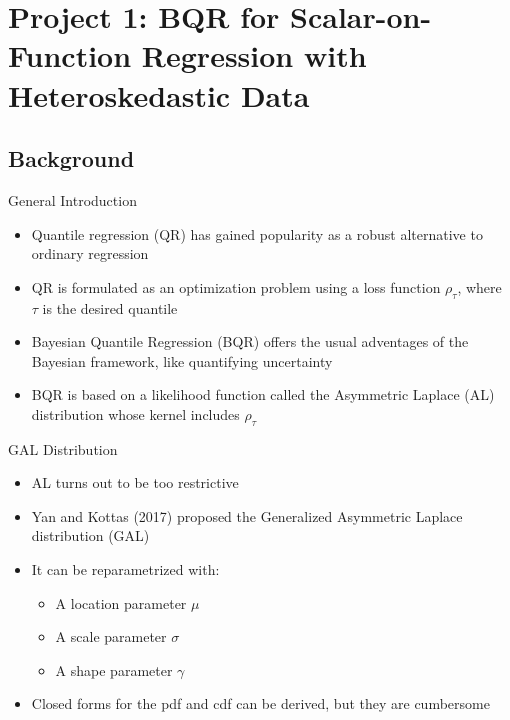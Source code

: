 \hypertarget{project-1-bqr-for-scalar-on-function-regression-with-heteroskedastic-data}{%
\section{Project 1: BQR for Scalar-on-Function Regression with
Heteroskedastic
Data}\label{project-1-bqr-for-scalar-on-function-regression-with-heteroskedastic-data}}

\hypertarget{background}{%
\subsection{Background}\label{background}}

\begin{frame}{General Introduction}
\protect\hypertarget{general-introduction}{}
\begin{itemize}
\tightlist
\item
  Quantile regression (QR) has gained popularity as a robust alternative
  to ordinary regression
\item
  QR is formulated as an optimization problem using a loss function
  \(\rho_\tau\), where \(\tau\) is the desired quantile
\item
  Bayesian Quantile Regression (BQR) offers the usual adventages of the
  Bayesian framework, like quantifying uncertainty
\item
  BQR is based on a likelihood function called the Asymmetric Laplace
  (AL) distribution whose kernel includes \(\rho_\tau\)
\end{itemize}
\end{frame}

\begin{frame}{GAL Distribution}
\protect\hypertarget{gal-distribution}{}
\begin{itemize}
\tightlist
\item
  AL turns out to be too restrictive
\item
  Yan and Kottas (2017) proposed the Generalized Asymmetric Laplace
  distribution (GAL)
\item
  It can be reparametrized with:

  \begin{itemize}
  \tightlist
  \item
    A location parameter \(\mu\)
  \item
    A scale parameter \(\sigma\)
  \item
    A shape parameter \(\gamma\)
  \end{itemize}
\item
  Closed forms for the pdf and cdf can be derived, but they are
  cumbersome
\end{itemize}
\end{frame}

